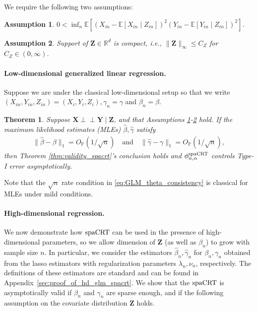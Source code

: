 \documentclass[12pt]{article}
\newtheorem{assumption}{Assumption}
\newtheorem{theorem}{Theorem}
\theoremstyle{definition}
\newcommand{\indep}{\perp \!\!\! \perp}
\def\P{\mathbb{P}}
\def\P{\mathbb{P}}
\newcommand{\E}{\mathbb E}								%
\renewcommand{\P}{\mathbb{P}}							%
\newcommand{\prx}{\bm X}								%
\newcommand{\srx}{X}									%
\newcommand{\prz}{\bm Z}								%
\newcommand{\srz}{Z}									%
\newcommand{\pry}{{\bm Y}}								%
\newcommand{\sry}{Y}									%
\newcommand{\spacrt}{\textnormal{spaCRT}}               %
\begin{document}
  We require the following two assumptions:
  \begin{assumption}\label{assu:non_degeneracy_variance}
  $0<\inf_n\E[(\srx_{in}-\E[\srx_{in}\mid \srz_{in}])^2(\sry_{in}-\E[\sry_{in}\mid \srz_{in}])^{2}]$.
  \end{assumption}
  
  \begin{assumption}\label{assu:compact_support_Z}
	Support of $\prz\in\mathbb{R}^d$ is compact, i.e., $\|\prz\|_{\infty}\leq C_Z$ for $C_Z\in(0,\infty)$.
  \end{assumption}
  
  
  \paragraph{Low-dimensional generalized linear regression.}
  
  Suppose we are under the classical low-dimensional setup so that we write $(\srx_{in},\sry_{in},\srz_{in})=(\srx_{i},\sry_{i},\srz_{i}),\gamma_n=\gamma$ and $\beta_n=\beta$.
  
  \begin{theorem}\label{thm:low_dim_glm_spacrt}
	Suppose $\prx\indep\pry \mid \prz$, and that Assumptions \ref{assu:non_degeneracy_variance}-\ref{assu:compact_support_Z} hold. If the maximum likelihood estimates (MLEs) $\widehat{\beta},\widehat{\gamma}$ satisfy
	\begin{align}\label{eq:GLM_theta_consistency}
	  \|\widehat{\beta}-\beta\|_1=O_\P(1/\sqrt{n})\quad\text{and}\quad\|\widehat{\gamma}-\gamma\|_1=O_\P(1/\sqrt{n}),
	\end{align}
	then Theorem \ref{thm:validity_spacrt}'s conclusion holds and $\phi_{n,\alpha}^\mathrm{\spacrt}$ controls Type-I error asymptotically.
  \end{theorem}
  Note that the $\sqrt{n}$ rate condition in \eqref{eq:GLM_theta_consistency} is classical for MLEs under mild conditions.
  
  
  \paragraph{High-dimensional regression.}
   
  We now demonstrate how $\spacrt$ can be used in the presence of high-dimensional parameters, so we allow dimension of $\prz$ (as well as $\beta_n$) to grow with sample size $n$. In particular, we consider the estimators $\widehat{\beta}_n,\widehat{\gamma}_n$ for $\beta_n,\gamma_n$ obtained from the lasso estimators \citep{tibshirani1996regression} with regularization parameters $\lambda_n,\nu_n$, respectively. The definitions of these estimators are standard and can be found in Appendix~\ref{sec:proof_of_hd_glm_spacrt}. We show that the $\spacrt$ is asymptotically valid if $\beta_n$ and $\gamma_n$ are sparse enough, and if the following assumption on the covariate distribution $\prz$ holds.
  
\end{document}
